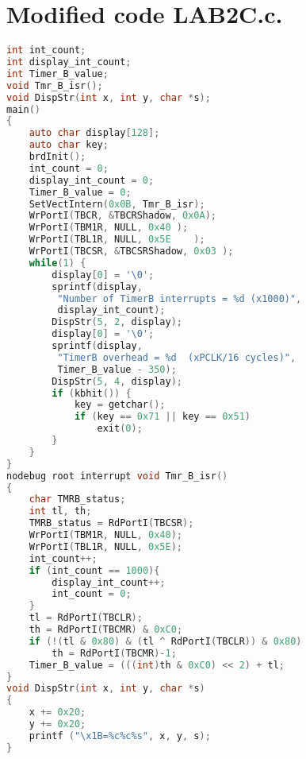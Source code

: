 \vfill \columnbreak
\section{Modified code LAB2C.c.}
\begin{lstlisting}[language=C]
int int_count;
int display_int_count;
int Timer_B_value;
void Tmr_B_isr();
void DispStr(int x, int y, char *s);
main()
{
    auto char display[128];
    auto char key;
    brdInit();
    int_count = 0;
    display_int_count = 0;
    Timer_B_value = 0;
    SetVectIntern(0x0B, Tmr_B_isr);
    WrPortI(TBCR, &TBCRShadow, 0x0A);
    WrPortI(TBM1R, NULL, 0x40 );
    WrPortI(TBL1R, NULL, 0x5E    );
    WrPortI(TBCSR, &TBCSRShadow, 0x03 );
    while(1) {
        display[0] = '\0';
        sprintf(display, 
         "Number of TimerB interrupts = %d (x1000)",
         display_int_count);
        DispStr(5, 2, display);
        display[0] = '\0';
        sprintf(display, 
         "TimerB overhead = %d  (xPCLK/16 cycles)",
         Timer_B_value - 350);
        DispStr(5, 4, display);
        if (kbhit()) {
            key = getchar();
            if (key == 0x71 || key == 0x51)
                exit(0);
        }
    }
}
nodebug root interrupt void Tmr_B_isr()
{
    char TMRB_status;
    int tl, th;
    TMRB_status = RdPortI(TBCSR);
    WrPortI(TBM1R, NULL, 0x40);
    WrPortI(TBL1R, NULL, 0x5E);
    int_count++;
    if (int_count == 1000){
        display_int_count++;
        int_count = 0;
    }
    tl = RdPortI(TBCLR);
    th = RdPortI(TBCMR) & 0xC0;
    if (!(tl & 0x80) & (tl ^ RdPortI(TBCLR)) & 0x80)
        th = RdPortI(TBCMR)-1;
    Timer_B_value = (((int)th & 0xC0) << 2) + tl;
}
void DispStr(int x, int y, char *s)
{
    x += 0x20;
    y += 0x20;
    printf ("\x1B=%c%c%s", x, y, s);
}
\end{lstlisting}
